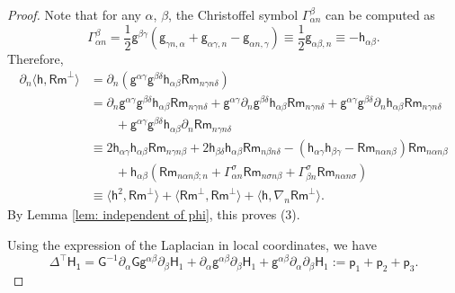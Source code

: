\documentclass[11pt]{amsart}
\theoremstyle{definition}
\numberwithin{equation}{section}
\begin{document}
\begin{proof}
    Note that for any $\alpha$, $\beta$, the Christoffel symbol $\mathsf\Gamma_{\alpha n}^\beta$ can be computed as
    \[\mathsf\Gamma_{\alpha n}^\beta = \frac{1}{2}\mathsf g^{\beta\gamma}(\mathsf g_{\gamma n,\alpha} + \mathsf g_{\alpha\gamma,n} - \mathsf g_{\alpha n,\gamma})\equiv \frac{1}{2}\mathsf g_{\alpha\beta,n}\equiv-\mathsf h_{\alpha\beta}.\]
    Therefore, 
    \begin{align*}
        \partial_n\langle\mathsf h, \mathsf{Rm}^\bot\rangle
        & = \partial_n(\mathsf g^{\alpha\gamma}\mathsf g^{\beta\delta}\mathsf h_{\alpha\beta}\mathsf{Rm}_{n\gamma n\delta})\\
        & = \partial_n\mathsf g^{\alpha\gamma}\mathsf g^{\beta\delta}\mathsf h_{\alpha\beta}\mathsf{Rm}_{n\gamma n\delta} + \mathsf g^{\alpha\gamma}\partial_n\mathsf g^{\beta\delta}\mathsf h_{\alpha\beta}\mathsf{Rm}_{n\gamma n\delta} + \mathsf g^{\alpha\gamma}\mathsf g^{\beta\delta}\partial_n\mathsf h_{\alpha\beta}\mathsf{Rm}_{n\gamma n\delta}\\
        &\qquad  + \mathsf g^{\alpha\gamma}\mathsf g^{\beta\delta}\mathsf h_{\alpha\beta}\partial_n\mathsf{Rm}_{n\gamma n\delta}\\
        &\equiv 2\mathsf h_{\alpha\gamma}\mathsf h_{\alpha\beta}\mathsf{Rm}_{n\gamma n\beta} + 2\mathsf h_{\beta\delta}\mathsf h_{\alpha\beta}\mathsf{Rm}_{n\beta n\delta} - (\mathsf h_{\alpha\gamma}\mathsf h_{\beta\gamma} - \mathsf{Rm}_{n\alpha n\beta})\mathsf{Rm}_{n\alpha n\beta}\\
        &\qquad  + \mathsf h_{\alpha\beta}(\mathsf{Rm}_{n\alpha n\beta;n} + \mathsf\Gamma_{\alpha n}^{\sigma}\mathsf{Rm}_{n\sigma n\beta} + \mathsf\Gamma_{\beta n}^{\sigma}\mathsf{Rm}_{n\alpha n\sigma})\\
        & \equiv \langle\mathsf h^2,\mathsf{Rm}^\bot\rangle + \langle\mathsf{Rm}^\bot,\mathsf{Rm}^\bot\rangle + \langle\mathsf h, \nabla_n\mathsf{Rm}^\bot\rangle.
    \end{align*}
    By Lemma \ref{lem: independent of phi}, this proves (3).

    Using the expression of the Laplacian in local coordinates, we have
    \[\mathsf{\Delta^\top H_1} = \mathsf G^{ - 1}\partial_\alpha\mathsf G\mathsf g^{\alpha\beta}\partial_\beta\mathsf H_1 + \partial_\alpha\mathsf g^{\alpha\beta}\partial_\beta\mathsf H_1 + \mathsf g^{\alpha\beta} \partial_\alpha\partial_\beta\mathsf H_1 := \mathsf p_1 + \mathsf p_2 + \mathsf p_3.\]
    

\end{proof}
\end{document}
